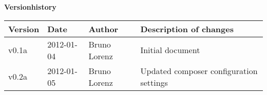 \noindent \textbf{\Large Versionhistory}\\

\newcommand{\versionrow}[4]{
    \hdashline
    \small #1 &
    \small #2 &
    \small #3 &
    \small #4 \\
}


\begin{table}[h]
    \begin{tabular*}{\textwidth}{l:l:l:l}
        \hline
        \versionrow{\textbf{Version}}{\textbf{Date}}{\textbf{Author}}{\textbf{Description of changes}}
        \hline
        \versionrow{v0.1a}{2012-01-04}{Bruno Lorenz}{Initial document}
        \versionrow{v0.2a}{2012-01-05}{Bruno Lorenz}{Updated composer configuration settings}
        \hline
    \end{tabular*}
\end{table}

